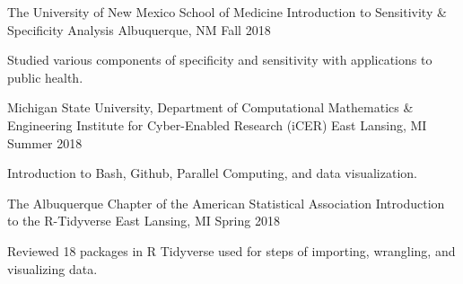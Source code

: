\begin{cventries}
  \cventry
    {The University of New Mexico School of Medicine} %
    {Introduction to Sensitivity \& Specificity Analysis} %
    {Albuquerque, NM} %
    {Fall 2018} %
    {
      \begin{cvitems} %
\item Studied various components of specificity and sensitivity with applications to public health. 
      \end{cvitems}
    }


  \cventry
    {Michigan State University, Department of Computational Mathematics \& Engineering} %
    {Institute for Cyber-Enabled Research (iCER)} %
    {East Lansing, MI} %
    {Summer 2018} %
    {
      \begin{cvitems} %
        \item Introduction to Bash, Github, Parallel Computing, and data visualization.
      \end{cvitems}
    }


  \cventry
    {The Albuquerque Chapter of the American Statistical Association} %
    {Introduction to the R-Tidyverse} %
    {East Lansing, MI} %
    {Spring 2018} %
    {
      \begin{cvitems} %
        \item Reviewed 18 packages in R Tidyverse used for steps of importing, wrangling, and visualizing data.
      \end{cvitems}
    }

\end{cventries}
